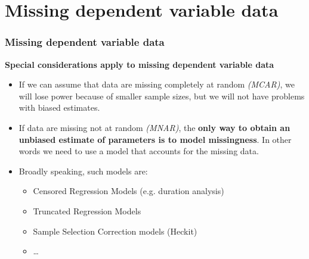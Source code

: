 \documentclass{beamer}
\begin{document}
\section{Missing dependent variable data}
\begin{frame}
\frametitle{Missing dependent variable data}

\textbf{Special considerations apply to missing dependent variable data}

\begin{itemize}
  \item If we can assume that data are missing completely at random \textit{(MCAR)}, we will lose power because of smaller sample sizes, but we will not have problems with biased estimates.
  \item If data are missing not at random \textit{(MNAR)}, the \textbf{only way to obtain an unbiased estimate of parameters is to model missingness}. In other words we need to use a model that accounts for the missing data.
  \item Broadly speaking, such models are:
  \begin{itemize}
    \item Censored Regression Models (e.g. duration analysis) 
    \item Truncated Regression Models 
    \item Sample Selection Correction models (Heckit)
    \item \dots
  \end{itemize}
\end{itemize}

\end{frame}





























\end{document}

